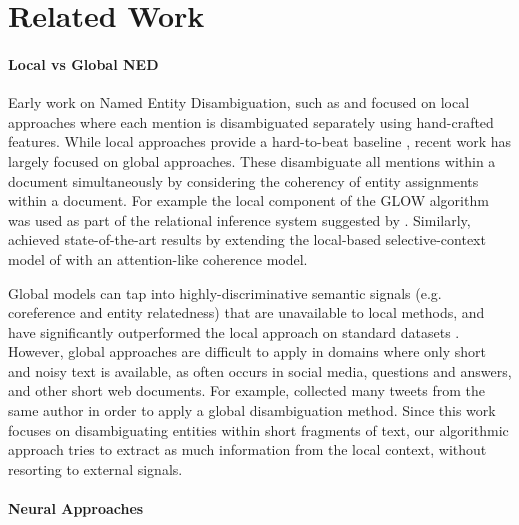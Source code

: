 \documentclass[11pt,a4paper]{article}
\begin{document}

	\section{Related Work}
	
	\paragraph{Local vs Global NED}
	
	Early work on Named Entity Disambiguation, such as  and  focused on local approaches where each mention is disambiguated separately using hand-crafted features. While local approaches provide a hard-to-beat baseline \cite{Ratinov2011}, recent work has largely focused on global approaches. These disambiguate all mentions within a document simultaneously by considering the coherency of entity assignments within a document. For example the local component of the GLOW algorithm \cite{Ratinov2011} was used as part of the relational inference system suggested by . Similarly,  achieved state-of-the-art results by extending the local-based selective-context model of  with an attention-like coherence model.
	
	Global models can tap into highly-discriminative semantic signals (e.g. coreference and entity relatedness) that are unavailable to local methods, and have significantly outperformed the local approach on standard datasets \cite{guo2014entity,pershina2015personalized,Globerson2016}.
	However, global approaches are difficult to apply in domains where only short and noisy text is available, as often occurs in social media, questions and answers, and other short web documents. For example,  collected many tweets from the same author in order to apply a global disambiguation method. Since this work focuses on disambiguating entities within short fragments of text, our algorithmic approach tries to extract as much information from the local context, without resorting to external signals.

	\paragraph{Neural Approaches}
	
\end{document}
